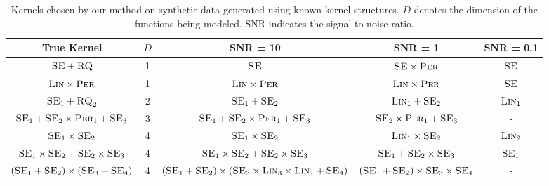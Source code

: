 \begin{table*}[ht!]
\caption{{\small
Kernels chosen by our method on synthetic data generated using known kernel structures. $D$ denotes the dimension of the functions being modeled.  SNR indicates the signal-to-noise ratio.
}}
\label{tbl:synthetic}
\begin{center}
{\small
\begin{tabular}{c c | c c c}
True Kernel & $D$ & SNR = 10 & SNR = 1 & \hspace{-1cm} SNR = 0.1 \\
\hline
$\textsc{SE} + \textsc{RQ}$                               & 1 
                                              & $\textsc{SE}$
                                              & $\textsc{SE} \times \textsc{Per}$
                                              & $\textsc{SE}$
                                              \\
$\textsc{Lin} \times \textsc{Per}$                        & 1 
                                              & $\textsc{Lin} \times \textsc{Per}$
                                              & $\textsc{Lin} \times \textsc{Per}$
                                              & $\textsc{SE}$
                                              \\
$\textsc{SE}_1 + \textsc{RQ}_2$                           & 2 
                                              & $\textsc{SE}_1 + \textsc{SE}_2$
                                              & $\textsc{Lin}_1 + \textsc{SE}_2$ 
                                              & $\textsc{Lin}_1$
                                              \\
$\textsc{SE}_1 + \textsc{SE}_2 \times \textsc{Per}_1 + \textsc{SE}_3$     & 3 
                                              & $\textsc{SE}_1 + \textsc{SE}_2 \times \textsc{Per}_1 + \textsc{SE}_3$
                                              & $\textsc{SE}_2 \times \textsc{Per}_1 + \textsc{SE}_3$
                                              & -
                                              \\
$\textsc{SE}_1 \times \textsc{SE}_2$                      & 4 
                                              & $\textsc{SE}_1 \times \textsc{SE}_2$
                                              & $\textsc{Lin}_1 \times \textsc{SE}_2$
                                              & $\textsc{Lin}_2$
                                              \\
$\textsc{SE}_1 \times \textsc{SE}_2 + \textsc{SE}_2 \times \textsc{SE}_3$ & 4 
                                              & $\textsc{SE}_1 \times \textsc{SE}_2 + \textsc{SE}_2 \times \textsc{SE}_3$
                                              & $\textsc{SE}_1 + \textsc{SE}_2 \times \textsc{SE}_3$
                                              & $\textsc{SE}_1$
                                              \\
$(\textsc{SE}_1 + \textsc{SE}_2) \times (\textsc{SE}_3 + \textsc{SE}_4)$  & 4 
                                              & $(\textsc{SE}_1 + \textsc{SE}_2) \times (\textsc{SE}_3\times\textsc{Lin}_3\times\textsc{Lin}_1 + \textsc{SE}_4)$
                                              & $(\textsc{SE}_1 + \textsc{SE}_2) \times \textsc{SE}_3 \times \textsc{SE}_4$
                                              & -
                                              \\
\end{tabular}
}
\end{center}
\end{table*}
